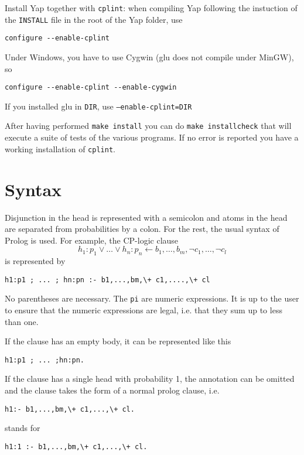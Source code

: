 \documentclass[a4paper,12pt]{article}
\begin{document}
Install Yap together with \texttt{cplint}:
when compiling Yap following the instuction of the \texttt{INSTALL} file in the root of the Yap folder, use
\begin{verbatim}
configure --enable-cplint
\end{verbatim}
Under Windows, you have to use Cygwin (glu does not compile under MinGW), so\\
\begin{verbatim}
configure --enable-cplint --enable-cygwin
\end{verbatim}
If you installed glu in \texttt{DIR}, use \texttt{--enable-cplint=DIR}

After having performed \texttt{make install} you can do \texttt{make installcheck} that will execute a suite of tests of the various programs. If no error is reported you have a working installation of \texttt{cplint}.


\section{Syntax}

Disjunction in the head is represented with a semicolon and atoms in the head are separated from probabilities by a colon. For the rest, the usual syntax of Prolog is used.
For example, the  CP-logic clause
$$h_1:p_1\vee \ldots \vee h_n:p_n\leftarrow b_1,\dots,b_m ,\neg c_1,\ldots,\neg c_l$$
is represented by
\begin{verbatim}
h1:p1 ; ... ; hn:pn :- b1,...,bm,\+ c1,....,\+ cl
\end{verbatim}
 No parentheses are necessary. The \texttt{pi} are numeric expressions. It is up to the user to ensure that the numeric expressions are legal, i.e. that they sum up to less than one.

If the clause has an empty body, it can be represented like this
\begin{verbatim}
h1:p1 ; ... ;hn:pn.
\end{verbatim}
If the clause has a single head with probability 1, the annotation can be omitted and the clause takes the form of a normal prolog clause, i.e. 
\begin{verbatim}
h1:- b1,...,bm,\+ c1,...,\+ cl.
\end{verbatim}
stands for 
\begin{verbatim}
h1:1 :- b1,...,bm,\+ c1,...,\+ cl.
\end{verbatim}
\end{document}

